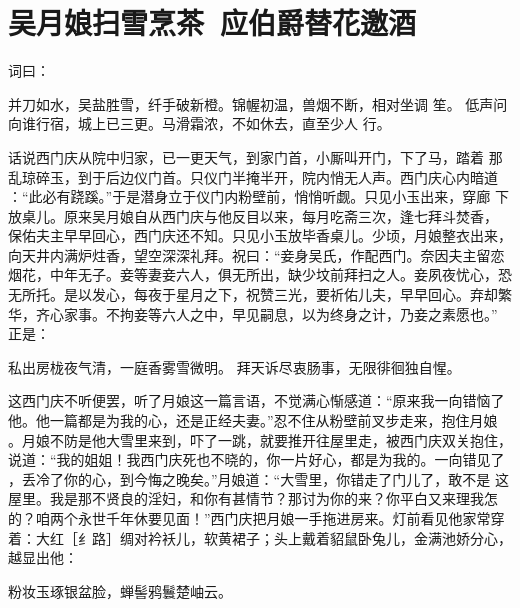 \chapter{吴月娘扫雪烹茶~应伯爵替花邀酒}

词曰：

并刀如水，吴盐胜雪，纤手破新橙。锦幄初温，兽烟不断，相对坐调
笙。  低声问向谁行宿，城上已三更。马滑霜浓，不如休去，直至少人
行。

话说西门庆从院中归家，已一更天气，到家门首，小厮叫开门，下了马，踏着
那乱琼碎玉，到于后边仪门首。只仪门半掩半开，院内悄无人声。西门庆心内暗道
：“此必有跷蹊。”于是潜身立于仪门内粉壁前，悄悄听觑。只见小玉出来，穿廊
下放桌儿。原来吴月娘自从西门庆与他反目以来，每月吃斋三次，逢七拜斗焚香，
保佑夫主早早回心，西门庆还不知。只见小玉放毕香桌儿。少顷，月娘整衣出来，
向天井内满炉炷香，望空深深礼拜。祝曰：“妾身吴氏，作配西门。奈因夫主留恋
烟花，中年无子。妾等妻妾六人，俱无所出，缺少坟前拜扫之人。妾夙夜忧心，恐
无所托。是以发心，每夜于星月之下，祝赞三光，要祈佑儿夫，早早回心。弃却繁
华，齐心家事。不拘妾等六人之中，早见嗣息，以为终身之计，乃妾之素愿也。”
正是：

私出房栊夜气清，一庭香雾雪微明。
拜天诉尽衷肠事，无限徘徊独自惺。

这西门庆不听便罢，听了月娘这一篇言语，不觉满心惭感道：“原来我一向错恼了
他。他一篇都是为我的心，还是正经夫妻。”忍不住从粉壁前叉步走来，抱住月娘
。月娘不防是他大雪里来到，吓了一跳，就要推开往屋里走，被西门庆双关抱住，
说道：“我的姐姐！我西门庆死也不晓的，你一片好心，都是为我的。一向错见了
，丢冷了你的心，到今悔之晚矣。”月娘道：“大雪里，你错走了门儿了，敢不是
这屋里。我是那不贤良的淫妇，和你有甚情节？那讨为你的来？你平白又来理我怎
的？咱两个永世千年休要见面！”西门庆把月娘一手拖进房来。灯前看见他家常穿
着：大红［纟路］绸对衿袄儿，软黄裙子；头上戴着貂鼠卧兔儿，金满池娇分心，
越显出他：

粉妆玉琢银盆脸，蝉髻鸦鬟楚岫云。

